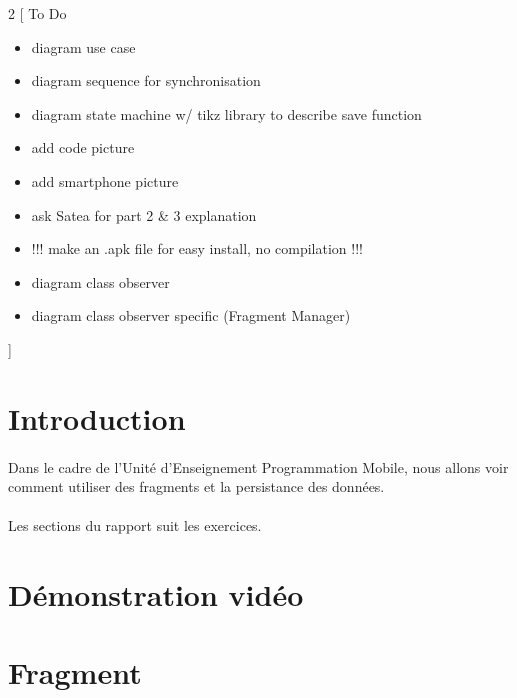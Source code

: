 \documentclass[a4paper]{article}
\begin{document}
    \newpage
    \begin{multicols}{2}
        [
            To Do
            \begin{itemize}
                \item diagram use case
                \item diagram sequence for synchronisation
                \item diagram state machine w/ tikz library to describe save function
                \item add code picture
                \item add smartphone picture
                \item ask Satea for part 2 \& 3 explanation
                \item !!! make an .apk file for easy install, no compilation !!!
                \item diagram class observer
                \item diagram class observer specific (Fragment Manager)
            \end{itemize}
        ]
        \section*{Introduction}
            \paragraph{}
                Dans le cadre de l'Unité d'Enseignement Programmation Mobile, nous allons voir comment utiliser des fragments et la persistance des données.
            \paragraph{}
                Les sections du rapport suit les exercices.
        \section*{Démonstration vidéo}
        \section{Fragment}

\end{multicols}
\end{document}
